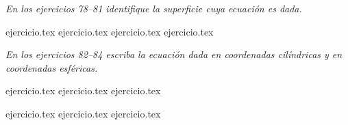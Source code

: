 \vspace{0.3cm}
\noindent\textit{En los ejercicios 78--81 identifique la superficie cuya ecuación es dada.}

\begin{enumerate}
    \setcounter{enumi}{77}
    {ejercicio.tex}
{ejercicio.tex}
{ejercicio.tex}
{ejercicio.tex}
\end{enumerate}

\vspace{0.3cm}
\noindent\textit{En los ejercicios 82--84 escriba la ecuación dada en coordenadas cilíndricas y en coordenadas esféricas.}

\begin{enumerate}
    \setcounter{enumi}{81}
    {ejercicio.tex}
{ejercicio.tex}
{ejercicio.tex}
\end{enumerate}

\vspace{0.3cm}
\begin{enumerate}
    \setcounter{enumi}{84}
    {ejercicio.tex}
{ejercicio.tex}
{ejercicio.tex}
\end{enumerate}
